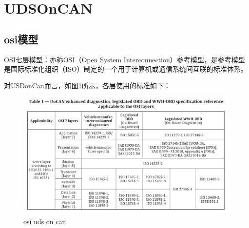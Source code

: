 \section{UDSOnCAN}
\subsection{osi模型}
OSI七层模型：亦称OSI（Open System Interconnection）参考模型，是参考模型是国际标准化组织（ISO）制定的一个用于计算机或通信系统间互联的标准体系。

对USDonCan而言，如图\ref{fig:usd_oncan}所示，各层使用的标准如下：
\begin{figure}[ht]
    \centering
    \includegraphics[]{pic/osi_uds_oncan.png}
    \caption{osi uds on can}
    \label{fig:usd_oncan}
\end{figure}
